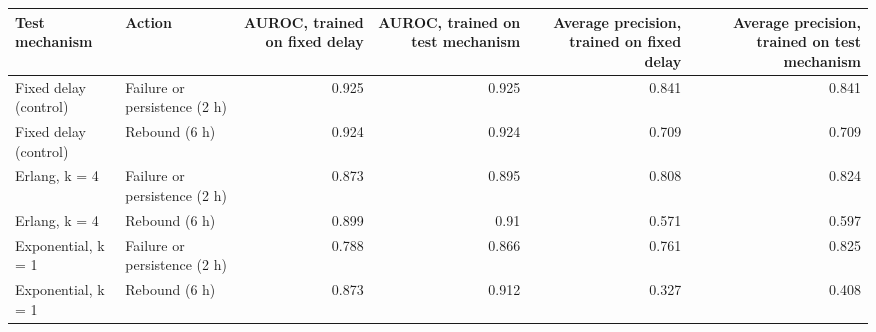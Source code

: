 \begin{tabular}{llrrrr}
\toprule
Test mechanism & Action & AUROC, trained on fixed delay & AUROC, trained on test mechanism & Average precision, trained on fixed delay & Average precision, trained on test mechanism \\
\midrule
Fixed delay (control) & Failure or persistence (2 h) & 0.925 & 0.925 & 0.841 & 0.841 \\
Fixed delay (control) & Rebound (6 h) & 0.924 & 0.924 & 0.709 & 0.709 \\
Erlang, k = 4 & Failure or persistence (2 h) & 0.873 & 0.895 & 0.808 & 0.824 \\
Erlang, k = 4 & Rebound (6 h) & 0.899 & 0.91 & 0.571 & 0.597 \\
Exponential, k = 1 & Failure or persistence (2 h) & 0.788 & 0.866 & 0.761 & 0.825 \\
Exponential, k = 1 & Rebound (6 h) & 0.873 & 0.912 & 0.327 & 0.408 \\
\bottomrule
\end{tabular}
